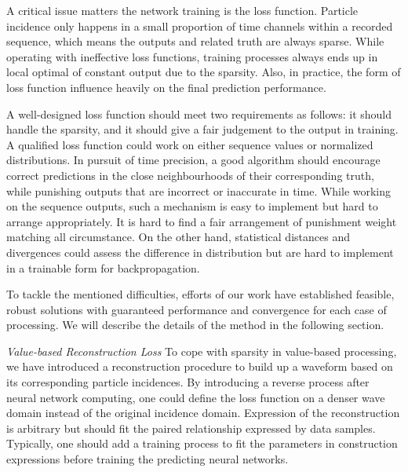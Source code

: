 
A critical issue matters the network training is the loss function. Particle incidence only happens in a small proportion of time channels within a recorded sequence, which means the outputs and related truth are always sparse. While operating with ineffective loss functions, training processes always ends up in local optimal of constant output due to the sparsity. Also, in practice, the form of loss function influence heavily on the final prediction performance. 

A well-designed loss function should meet two requirements as follows: it should handle the sparsity, and it should give a fair judgement to the output in training. A qualified loss function could work on either sequence values or normalized distributions. In pursuit of time precision, a good algorithm should encourage correct predictions in the close neighbourhoods of their corresponding truth, while punishing outputs that are incorrect or inaccurate in time. While working on the sequence outputs, such a mechanism is easy to implement but hard to arrange appropriately. It is hard to find a fair arrangement of punishment weight matching all circumstance. On the other hand, statistical distances and divergences could assess the difference in distribution but are hard to implement in a trainable form for backpropagation. 

To tackle the mentioned difficulties, efforts of our work have established feasible, robust solutions with guaranteed performance and convergence for each case of processing. We will describe the details of the method in the following section.

\emph{Value-based Reconstruction Loss}
To cope with sparsity in value-based processing, we have introduced a reconstruction procedure to build up a waveform based on its corresponding particle incidences. By introducing a reverse process after neural network computing, one could define the loss function on a denser wave domain instead of the original incidence domain. Expression of the reconstruction is arbitrary but should fit the paired relationship expressed by data samples. Typically, one should add a training process to fit the parameters in construction expressions before training the predicting neural networks.

